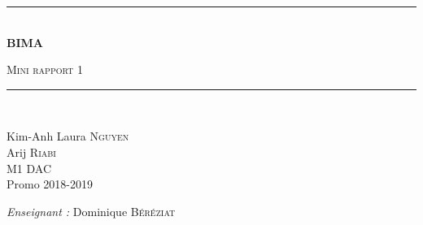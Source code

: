 \documentclass[a4paper]{article}
\newcommand{\HRule}{\rule{\linewidth}{0.5mm}}
\begin{document}
\begin{titlepage}
  \begin{center}


      \vspace{4cm}
    \HRule \\[0.4cm]
    { \huge \bfseries BIMA\\[0.4cm] }

      \textsc{\LARGE Mini rapport 1}\\[0.4cm]

    \HRule \\[0.8cm]

    \begin{minipage}{0.4\textwidth}
      \begin{flushleft} \large
        Kim-Anh Laura \textsc{Nguyen}\\
        \large
        Arij \textsc{Riabi}\\
        M1 DAC\\
        Promo 2018-2019 \\
      \end{flushleft}
    \end{minipage}
    \begin{minipage}{0.5\textwidth}
      \begin{flushright} \large
        \emph{Enseignant :} Dominique \textsc{Béréziat}\\
      \end{flushright}
    \end{minipage}

      \vspace{2cm}

  \end{center}
\end{titlepage}
\end{document}
